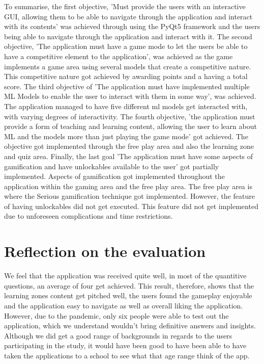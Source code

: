 		To summarise, the first objective, 'Must provide the users with an interactive GUI, allowing them to be able to navigate through the application and interact with its contents' was achieved through using the PyQt5 framework and the users being able to navigate through the application and interact with it. The second objective, 'The application must have a game mode to let the users be able to have a competitive element to the application', was achieved as the game implements a game area using several models that create a competitive nature. This competitive nature got achieved by awarding points and a having a total score. The third objective of 'The application must have implemented multiple ML Models to enable the user to interact with them in some way', was achieved. The application managed to have five different ml models get interacted with, with varying degrees of interactivity. The fourth objective, 'the application must provide a form of teaching and learning content, allowing the user to learn about ML and the models more than just playing the game mode' got achieved. The objective got implemented through the free play area and also the learning zone and quiz area. Finally, the last goal 'The application must have some aspects of gamification and have unlockables available to the user' got partially implemented. Aspects of gamification got implemented throughout the application within the gaming area and the free play area. The free play area is where the Serious gamification technique got implemented. However, the feature of having unlockables did not get executed. This feature did not get implemented due to unforeseen complications and time restrictions.

	\section{Reflection on the evaluation}
		We feel that the application was received quite well, in most of the quantitive questions, an average of four get achieved. This result, therefore, shows that the learning zones content get pitched well, the users found the gameplay enjoyable and the application easy to navigate as well as overall liking the application. However, due to the pandemic, only six people were able to test out the application, which we understand wouldn't bring definitive answers and insights. Although we did get a good range of backgrounds in regards to the users participating in the study, it would have been good to have been able to have taken the applications to a school to see what that age range think of the app.
		
